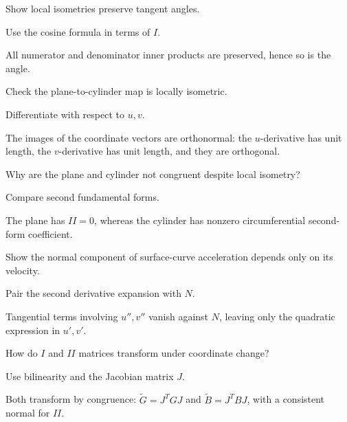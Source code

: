 \begin{exercise}\label{exr:vii15-19}
Show local isometries preserve tangent angles.
\end{exercise}
\begin{hint}
Use the cosine formula in terms of \(I\).
\end{hint}
\begin{solution}
All numerator and denominator inner products are preserved, hence so is the angle.
\end{solution}

\begin{exercise}\label{exr:vii15-20}
Check the plane-to-cylinder map is locally isometric.
\end{exercise}
\begin{hint}
Differentiate with respect to \(u,v\).
\end{hint}
\begin{solution}
The images of the coordinate vectors are orthonormal: the \(u\)-derivative has unit length, the \(v\)-derivative has unit length, and they are orthogonal.
\end{solution}

\begin{exercise}\label{exr:vii15-21}
Why are the plane and cylinder not congruent despite local isometry?
\end{exercise}
\begin{hint}
Compare second fundamental forms.
\end{hint}
\begin{solution}
The plane has \(II=0\), whereas the cylinder has nonzero circumferential second-form coefficient.
\end{solution}

\begin{exercise}\label{exr:vii15-22}
Show the normal component of surface-curve acceleration depends only on its velocity.
\end{exercise}
\begin{hint}
Pair the second derivative expansion with \(N\).
\end{hint}
\begin{solution}
Tangential terms involving \(u'',v''\) vanish against \(N\), leaving only the quadratic expression in \(u',v'\).
\end{solution}

\begin{exercise}\label{exr:vii15-23}
How do \(I\) and \(II\) matrices transform under coordinate change?
\end{exercise}
\begin{hint}
Use bilinearity and the Jacobian matrix \(J\).
\end{hint}
\begin{solution}
Both transform by congruence: \(\widetilde G=J^TGJ\) and \(\widetilde B=J^TBJ\), with a consistent normal for \(II\).
\end{solution}

